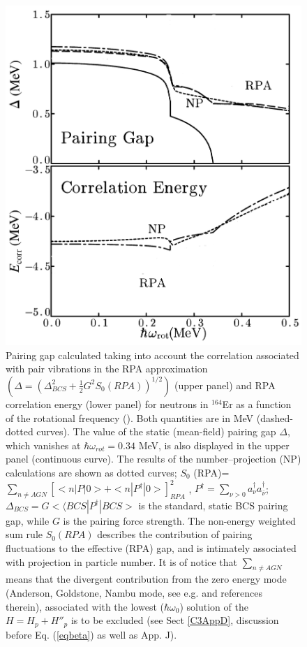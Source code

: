   \begin{figure}
  \centerline{\includegraphics*[width=\textwidth,angle=0]{nutshell/figs/fig1_1_2.pdf}}
  \caption{Pairing gap calculated taking into account the correlation associated with pair vibrations in the RPA approximation $(\Delta=(\Delta^2_{BCS}+\tfrac{1}{2}G^2S_0(RPA))^{1/2})$ (upper panel) and RPA correlation energy (lower panel) for neutrons in $^{164}$Er as a function of the rotational frequency (\cite{Shimizu:89,Shimizu:13}). Both quantities are in MeV (dashed-dotted curves). The value of the static (mean-field) pairing gap $\Delta$, which vanishes at $\hbar \omega_{rot}=0.34 $ MeV, is also displayed in the upper panel (continuous curve). The results of the number--projection (NP) calculations are shown as dotted curves;  $S_0$ (RPA)= $\sum_{n \neq AGN} \left[<n|P |0>  + <n|P^{\dagger} |0>\right]^2_{RPA}$ , $P^\dagger=\sum_{\nu>0}a^\dagger_\nu a^\dagger_{\bar \nu}$; \mbox{$\Delta_{BCS} = G<⟨BCS|P^{\dagger}|BCS>$} is the standard, static BCS pairing gap,
    while $G$ is the pairing force strength. The non-energy weighted sum rule $S_0 (RPA)$
    describes the contribution of pairing fluctuations to the effective (RPA) gap,
    and is intimately associated with projection in particle number. It is of notice
    that $\sum_{n \neq AGN}$ means that the divergent contribution from the zero energy mode
    (Anderson, Goldstone, Nambu mode, see e.g. \cite{Broglia:00} and references therein), associated with the lowest ($\hbar \omega_0$) solution
    of the $H=H_{p}+H''_p$ is to be excluded (see Sect \ref{C3AppD}, discussion before Eq. (\ref{eqbeta}) as well as \cite{Brink:05} App. J).}\label{fig1.2}
  \end{figure}
  
